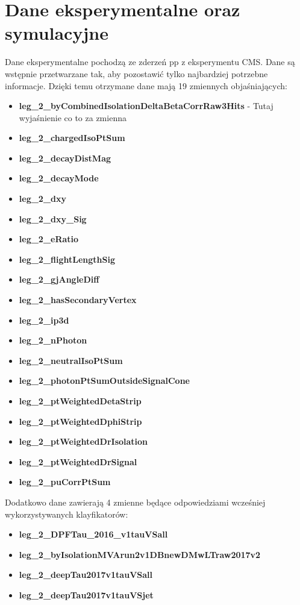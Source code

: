\documentclass{pracalicmgr}
\begin{document}
    \chapter{Dane eksperymentalne oraz symulacyjne}
    \label{ch:dane}
    Dane eksperymentalne pochodzą ze zderzeń pp z eksperymentu CMS. %
Dane są wstępnie przetwarzane tak, aby pozostawić tylko najbardziej potrzebne informacje. Dzięki temu otrzymane dane mają 19 zmiennych objaśniających:
	\begin{itemize}
	\item \textbf{leg\_2\_byCombinedIsolationDeltaBetaCorrRaw3Hits} - Tutaj wyjaśnienie co to za zmienna
	\item \textbf{leg\_2\_chargedIsoPtSum}
	\item \textbf{leg\_2\_decayDistMag}
	\item \textbf{leg\_2\_decayMode}
	\item \textbf{leg\_2\_dxy}
	\item \textbf{leg\_2\_dxy\_Sig}
	\item \textbf{leg\_2\_eRatio}
	\item \textbf{leg\_2\_flightLengthSig}
	\item \textbf{leg\_2\_gjAngleDiff}
	\item \textbf{leg\_2\_hasSecondaryVertex}
	\item \textbf{leg\_2\_ip3d}
	\item \textbf{leg\_2\_nPhoton}
	\item \textbf{leg\_2\_neutralIsoPtSum}
	\item \textbf{leg\_2\_photonPtSumOutsideSignalCone}
	\item \textbf{leg\_2\_ptWeightedDetaStrip}
	\item \textbf{leg\_2\_ptWeightedDphiStrip}
	\item \textbf{leg\_2\_ptWeightedDrIsolation}
	\item \textbf{leg\_2\_ptWeightedDrSignal}
	\item \textbf{leg\_2\_puCorrPtSum}
	\end{itemize}
	
	Dodatkowo dane zawierają 4 zmienne będące odpowiedziami wcześniej wykorzystywanych klayfikatorów:
	\begin{itemize}
	\item \textbf{leg\_2\_DPFTau\_2016\_v1tauVSall}
	\item \textbf{leg\_2\_byIsolationMVArun2v1DBnewDMwLTraw2017v2}
	\item \textbf{leg\_2\_deepTau2017v1tauVSall}
	\item \textbf{leg\_2\_deepTau2017v1tauVSjet}
	\end{itemize}
	
\end{document}
